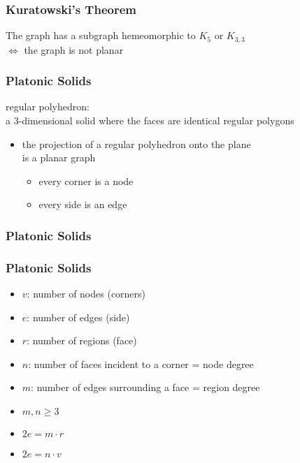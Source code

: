 \documentclass[dvipsnames]{beamer}
\begin{document}
\begin{frame}
  \frametitle{Kuratowski's Theorem}

  \begin{theorem}
    The graph has a subgraph hemeomorphic to $K_5$ or $K_{3,3}$\\
    $\Leftrightarrow$ the graph is not planar
  \end{theorem}
\end{frame}

\begin{frame}
  \frametitle{Platonic Solids}

  \begin{definition}
    \alert{regular polyhedron}:\\
    a 3-dimensional solid where the faces are identical regular polygons
  \end{definition}

  \pause
  \begin{itemize}
    \item the projection of a regular polyhedron onto the plane\\
      is a planar graph
    \begin{itemize}
      \item every corner is a node
      \item every side is an edge
    \end{itemize}
  \end{itemize}
\end{frame}

\begin{frame}
  \frametitle{Platonic Solids}

  \begin{example}
    \begin{center}
    \end{center}
  \end{example}
\end{frame}

\begin{frame}
  \frametitle{Platonic Solids}

  \begin{itemize}
    \item $v$: number of nodes (corners)
    \item $e$: number of edges (side)
    \item $r$: number of regions (face)
    \item $n$: number of faces incident to a corner = node degree
    \item $m$: number of edges surrounding a face = region degree
  \end{itemize}

  \pause
  \begin{itemize}
    \item $m,n \geq 3$
    \item $2e = m \cdot r$
    \item $2e = n \cdot v$
  \end{itemize}
\end{frame}
\end{document}
